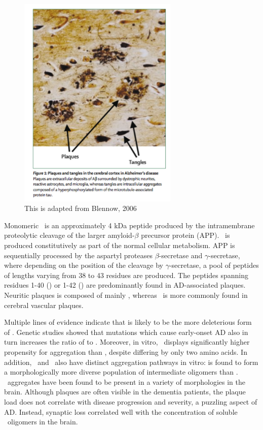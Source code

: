 \begin{figure}
  \centering
  \includegraphics[width=3in]{figures/introduction/AD_tissue_pathology.pdf}
  \caption[Image of lesions formed by plaques and NFTs on brain tissue]{This is adapted from Blennow, 2006}
  \label{fig:AD_tissue_pathology}
\end{figure}

Monomeric \abeta\ is an approximately 4 kDa peptide produced by the intramembrane proteolytic cleavage of the larger amyloid-$\beta$ precursor protein (APP).  \abeta\ is produced constitutively as part of the normal cellular metabolism.\cite{Hardy:2002dh} APP is sequentially processed by the aspartyl proteases $\beta$-secretase and $\gamma$-secretase, where depending on the position of the cleavage by $\gamma$-secretase, a pool of \abeta peptides of lengths varying from 38 to 43 residues are produced. The peptides spanning residues 1-40 (\abetaforty) or 1-42 (\abetafortytwo) are predominantly found in AD-associated plaques. Neuritic plaques is composed of mainly \abetafortytwo, whereas \abetaforty\ is more commonly found in cerebral vascular plaques.

Multiple lines of evidence indicate that \abetafortytwo is likely to be the more deleterious form of \abeta. Genetic studies showed that mutations which cause early-onset AD also in turn increases the ratio of \abetafortytwo to \abetaforty.\cite{Hardy:1997tu} Moreover, in vitro, \abetafortytwo\ displays significantly higher propensity for aggregation than \abetaforty, despite differing by only two amino acids. In addition, \abetaforty\ and \abetafortytwo\ also have distinct aggregation pathways in vitro: \abetafortytwo is found to form a morphologically more diverse population of intermediate oligomers than \abetaforty.\cite{Bitan:2003ut} %
\abeta\ aggregates have been found to be present in a variety of morphologies in the brain. Although plaques are often visible in the dementia patients, the plaque load does not correlate with disease progression and severity, a puzzling aspect of AD.  Instead, synaptic loss correlated well with the concentration of soluble \abeta\ oligomers in the brain.


